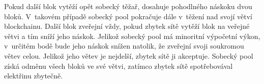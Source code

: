 Pokud další blok vytěží opět sobecký těžař, dosahuje pohodlného náskoku dvou bloků. V~takovém případě sobecký pool pokračuje dále v~těžení nad svojí větví blockchainu. Další blok zveřejní vždy, pokud zbytek sítě vytěží blok na veřejné větvi a tím sníží jeho náskok. Jelikož sobecký pool má minoritní výpočetní výkon, v~určitém bodě bude jeho náskok snížen natolik, že zveřejní svoji soukromou větev celou. Jelikož jeho větev je nejdelší, zbytek sítě ji akceptuje. Sobecký pool získá odměnu všech bloků ve své větvi, zatímco zbytek sítě spotřebovával elektřinu zbytečně.

